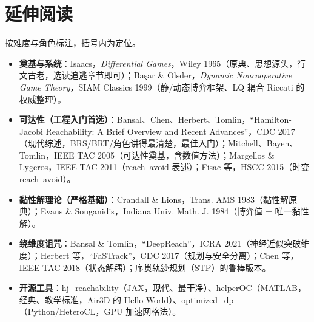\section*{延伸阅读}
按难度与角色标注，括号内为定位。
\begin{itemize}
  \item \textbf{奠基与系统}：Isaacs，\emph{Differential Games}，Wiley 1965\cite{isaacs1965differential}（原典、思想源头，行文古老，选读追逃章节即可）；Ba\c{s}ar \& Olsder，\emph{Dynamic Noncooperative Game Theory}，SIAM Classics 1999\cite{basar1999dynamic}（静/动态博弈框架、LQ 耦合 Riccati 的权威整理）。
  \item \textbf{可达性（工程入门首选）}：Bansal、Chen、Herbert、Tomlin，“Hamilton-Jacobi Reachability: A Brief Overview and Recent Advances”，CDC 2017\cite{bansal2017hamilton}（现代综述，BRS/BRT/角色讲得最清楚，最佳入门）；Mitchell、Bayen、Tomlin，IEEE TAC 2005\cite{mitchell2005time}（可达性奠基，含数值方法）；Margellos \& Lygeros，IEEE TAC 2011\cite{margellos2011hamilton}（reach--avoid 表述）；Fisac 等，HSCC 2015\cite{fisac2015reach}（时变 reach--avoid）。
  \item \textbf{黏性解理论（严格基础）}：Crandall \& Lions，Trans. AMS 1983\cite{crandall1983viscosity}（黏性解原典）；Evans \& Souganidis，Indiana Univ. Math. J. 1984\cite{evans1984differential}（博弈值 = 唯一黏性解）。
  \item \textbf{绕维度诅咒}：Bansal \& Tomlin，“DeepReach”，ICRA 2021\cite{bansal2021deepreach}（神经近似突破维度）；Herbert 等，“FaSTrack”，CDC 2017\cite{herbert2017fastrack}（规划与安全分离）；Chen 等，IEEE TAC 2018\cite{chen2018decomposition}（状态解耦）；序贯轨迹规划（STP）的鲁棒版本\cite{chen2017robust}。
  \item \textbf{开源工具}：hj\_reachability（JAX，现代、最干净）、helperOC（MATLAB，经典、教学标准，Air3D 的 Hello World）、optimized\_dp（Python/HeteroCL，GPU 加速网格法）。
\end{itemize}

